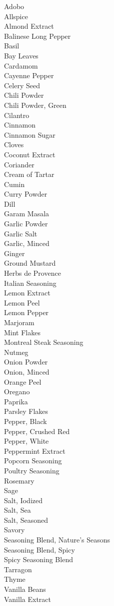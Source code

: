 \documentclass[twocolumn]{article}
\begin{document}
Adobo\\
Allspice\\
Almond Extract\\
Balinese Long Pepper\\
Basil\\
Bay Leaves\\
Cardamom\\
Cayenne Pepper\\
Celery Seed\\
Chili Powder\\
Chili Powder, Green\\
Cilantro\\
Cinnamon\\
Cinnamon Sugar\\
Cloves\\
Coconut Extract\\
Coriander\\
Cream of Tartar\\
Cumin\\
Curry Powder\\
Dill\\
Garam Masala\\
Garlic Powder\\
Garlic Salt\\
Garlic, Minced\\
Ginger\\
Ground Mustard\\
Herbs de Provence\\
Italian Seasoning\\
Lemon Extract\\
Lemon Peel\\
Lemon Pepper\\
Marjoram\\
Mint Flakes\\
Montreal Steak Seasoning\\
Nutmeg\\
Onion Powder\\
Onion, Minced\\
Orange Peel\\
Oregano\\
Paprika\\
Parsley Flakes\\
Pepper, Black\\
Pepper, Crushed Red\\
Pepper, White\\
Peppermint Extract\\
Popcorn Seasoning\\
Poultry Seasoning\\
Rosemary\\
Sage\\
Salt, Iodized\\
Salt, Sea\\
Salt, Seasoned\\
Savory\\
Seasoning Blend, Nature's Seasons\\
Seasoning Blend, Spicy\\
Spicy Seasoning Blend\\
Tarragon\\
Thyme\\
Vanilla Beans\\
Vanilla Extract\\
\end{document}
